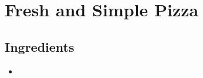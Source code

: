\thispagestyle{fancy}
\section{Fresh and Simple Pizza}
\AddToShipoutPicture*{\Pizza}

\subsection*{Ingredients}
\begin{multicols}{3}
	\begin{itemize}
		\item 
	\end{itemize}
\end{multicols}